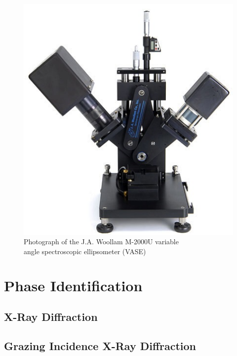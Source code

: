 \begin{figure}[htbp]
   \centering
   \includegraphics[width=0.66\linewidth]{./figures/characterization/M2000_ellipsometer_image.png} 
   \caption[J.A. Woollam M-2000U Ellipsometer]%
   		{Photograph of the J.A. Woollam M-2000U variable \\%
   		 angle spectroscopic ellipsometer (VASE)}
   \label{fig:M2000_image}
\end{figure}


	
\section{Phase Identification}


\subsection{X-Ray Diffraction}

\lipsum	


\subsection{Grazing Incidence X-Ray Diffraction}

\lipsum



